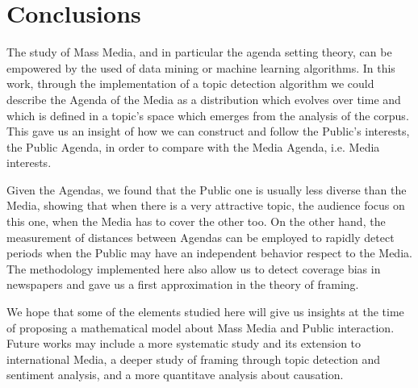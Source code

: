 \section{Conclusions}

\par The study of Mass Media, and in particular the agenda setting theory, can be empowered by the used of data mining or machine learning algorithms. 
In this work, through the implementation of a topic detection algorithm we could describe the Agenda of the Media as a distribution which evolves over time and which is defined in a topic's space which emerges from the analysis of the corpus.
This gave us an insight of how we can construct and follow the Public's interests, the Public Agenda, in order to compare with the Media Agenda, i.e. Media interests. 
\par Given the Agendas, we found that the Public one is usually less diverse than the Media, showing that when there is a very attractive topic, the audience focus on this one, when the Media has to cover the other too. 
On the other hand, the measurement of distances between Agendas can be employed to rapidly detect periods when the Public may have an independent behavior respect to the Media. The methodology implemented here also allow us to detect coverage bias in newspapers and gave us a first approximation in the theory of framing. 
\par We hope that some of the elements studied here will give us insights at the time of proposing a mathematical model about Mass Media and Public interaction. Future works may include a more systematic study and its extension to international Media, a deeper study of framing through topic detection and sentiment analysis, and a more quantitave analysis about causation.
